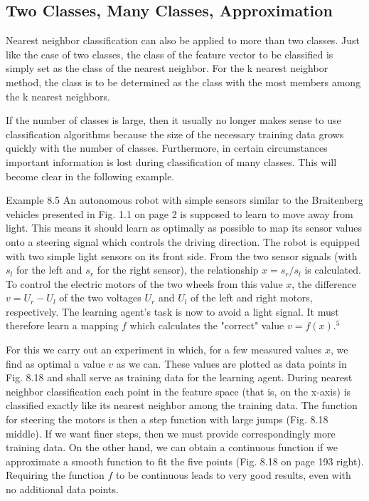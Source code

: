 \documentclass[10pt]{book}
\begin{document}
\subsection{Two Classes, Many Classes, Approximation}
Nearest neighbor classification can also be applied to more than two classes. Just like the case of two classes, the class of the feature vector to be classified is simply set as the class of the nearest neighbor. For the k nearest neighbor method, the class is to be determined as the class with the most members among the k nearest neighbors.

If the number of classes is large, then it usually no longer makes sense to use classification algorithms because the size of the necessary training data grows quickly with the number of classes. Furthermore, in certain circumstances important information is lost during classification of many classes. This will become clear in the following example.

Example 8.5 An autonomous robot with simple sensors similar to the Braitenberg vehicles presented in Fig. 1.1 on page 2 is supposed to learn to move away from light. This means it should learn as optimally as possible to map its sensor values onto a steering signal which controls the driving direction. The robot is equipped with two simple light sensors on its front side. From the two sensor signals (with $s_{l}$ for the left and $s_{r}$ for the right sensor), the relationship $x=s_{r} / s_{l}$ is calculated. To control the electric motors of the two wheels from this value $x$, the difference $v=U_{r}-U_{l}$ of the two voltages $U_{r}$ and $U_{l}$ of the left and right motors, respectively. The learning agent's task is now to avoid a light signal. It must therefore learn a mapping $f$ which calculates the "correct" value $v=f(x) .^{5}$

For this we carry out an experiment in which, for a few measured values $x$, we find as optimal a value $v$ as we can. These values are plotted as data points in Fig. 8.18 and shall serve as training data for the learning agent. During nearest neighbor classification each point in the feature space (that is, on the x-axis) is classified exactly like its nearest neighbor among the training data. The function for steering the motors is then a step function with large jumps (Fig. 8.18 middle). If we want finer steps, then we must provide correspondingly more training data. On the other hand, we can obtain a continuous function if we approximate a smooth function to fit the five points (Fig. 8.18 on page 193 right). Requiring the function $f$ to be continuous leads to very good results, even with no additional data points.
\end{document}
